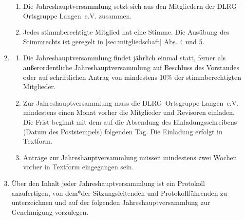 \documentclass[%
12pt, %
a4paper, %
headsepline, %
parskip, %
headings=normal, %
]{scrreprt}
\begin{document}
\begin{enumerate}
\begin{enumerate}[noitemsep]
        \item Die Jahreshauptversammlung setzt sich aus den Mitgliedern der DLRG--Ortsgruppe Langen~e.V. zusammen.
        \item Jedes stimmberechtigte Mitglied hat eine Stimme. Die Ausübung des Stimmrechts ist geregelt in \ref{sec:mitgliedschaft} Abs. 4 und 5.
      \end{enumerate}
    \item \begin{enumerate}[noitemsep]
        \item Die Jahreshauptversammlung findet jährlich einmal statt, ferner als außerordentliche Jahreshauptversammlung auf Beschluss des Vorstandes oder auf schriftlichen Antrag von mindestens 10\% der stimmberechtigten Mitglieder.
        \item Zur Jahreshauptversammlung muss die DLRG--Ortsgruppe Langen~e.V. mindestens einen Monat vorher die Mitglieder und Revisoren einladen. Die Frist beginnt mit dem auf die Absendung des Einladungsschreibens (Datum des Poststempels) folgenden Tag. Die Einladung erfolgt in Textform.
        \item Anträge zur Jahreshauptversammlung müssen mindestens zwei Wochen vorher in Textform eingegangen sein.
      \end{enumerate}
    \item Über den Inhalt jeder Jahreshauptversammlung ist ein Protokoll anzufertigen, von dem*der Sitzungsleitenden und Protokollführenden zu unterzeichnen und auf der folgenden Jahreshauptversammlung zur Genehmigung vorzulegen.
\end{enumerate}
\end{document}
